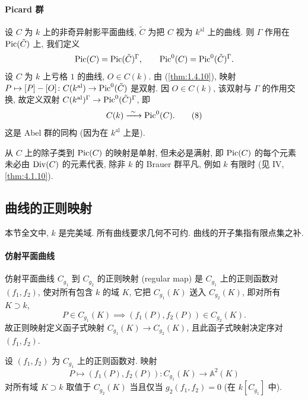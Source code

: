 \paragraph{Picard 群}
设 $C$ 为 $k$ 上的非奇异射影平面曲线, $\tilde{C}$ 为把 $C$ 视为 $k^{\mathrm{al}}$ 上的曲线. 则 $\Gamma$ 作用在 $\operatorname{Pic}(\tilde{C})$ 上, 我们定义
\[
\operatorname{Pic}(C) = \operatorname{Pic}(\tilde{C})^\Gamma, \qquad
\operatorname{Pic}^0(C) = \operatorname{Pic}^0(\tilde{C})^\Gamma.
\]
设 $C$ 为 $k$ 上亏格 $1$ 的曲线, $O\in C(k)$. 由 (\ref{thm:1.4.10}), 映射 $P\mapsto[P] - [O]\colon C(k^{\mathrm{al}})\to\operatorname{Pic}^0(\tilde{C})$ 是双射. 因 $O\in C(k)$, 该双射与 $\Gamma$ 的作用交换, 故定义双射 $C(k^{\mathrm{al}})^\Gamma\to\operatorname{Pic}^0(\tilde{C})^\Gamma$, 即
\begin{equation} \label{eq:8}
C(k) \xrightarrow{\ \sim\ } \operatorname{Pic}^0(C).
\tag{8}
\end{equation}
这是 Abel 群的同构 (因为在 $k^{\mathrm{al}}$ 上是).

\begin{remark} \label{thm:1.4.14} 
从 $C$ 上的除子类到 $\operatorname{Pic}(C)$ 的映射是单射, 但未必是满射, 即 $\operatorname{Pic}(C)$ 的每个元素未必由 $\operatorname{Div}(C)$ 的元素代表, 除非 $k$ 的 Brauer 群平凡, 例如 $k$ 有限时 (见 IV, \ref{thm:4.1.10}).
\end{remark}

\subsection*{曲线的正则映射}

本节全文中, $k$ 是完美域. 所有曲线要求几何不可约. 曲线的开子集指有限点集之补.

\paragraph{仿射平面曲线}
仿射平面曲线 $C_{g_1}$ 到 $C_{g_2}$ 的正则映射 (regular map) 是 $C_{g_1}$ 上的正则函数对 $(f_1, f_2)$, 使对所有包含 $k$ 的域 $K$, 它把 $C_{g_1}(K)$ 送入 $C_{g_2}(K)$, 即对所有 $K\supset k$,
\[
P\in C_{g_1}(K) \implies (f_1(P), f_2(P))\in C_{g_2}(K).
\]
故正则映射定义函子式映射 $C_{g_1}(K)\to C_{g_2}(K)$, 且此函子式映射决定序对 $(f_1,f_2)$.

\begin{lemma} \label{thm:1.4.15} 
设 $(f_1,f_2)$ 为 $C_{g_1}$ 上的正则函数对. 映射
\[
P\mapsto(f_1(P), f_2(P))\colon C_{g_1}(K)\to\mathbb{A}^2(K)
\]
对所有域 $K\supset k$ 取值于 $C_{g_2}(K)$ 当且仅当 $g_2(f_1,f_2) = 0$ (在 $k[C_{g_1}]$ 中).
\end{lemma}

